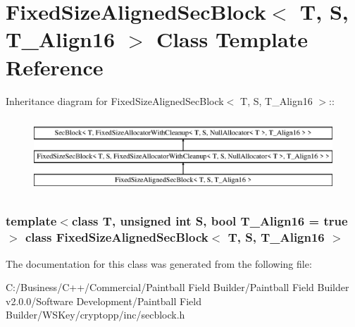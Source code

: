 \hypertarget{class_fixed_size_aligned_sec_block}{
\section{FixedSizeAlignedSecBlock$<$ T, S, T\_\-Align16 $>$ Class Template Reference}
\label{class_fixed_size_aligned_sec_block}
}
Inheritance diagram for FixedSizeAlignedSecBlock$<$ T, S, T\_\-Align16 $>$::\begin{figure}[H]
\begin{center}
\leavevmode
\includegraphics[height=2.85229cm]{class_fixed_size_aligned_sec_block}
\end{center}
\end{figure}
\subsubsection*{template$<$class T, unsigned int S, bool T\_\-Align16 = true$>$ class FixedSizeAlignedSecBlock$<$ T, S, T\_\-Align16 $>$}



The documentation for this class was generated from the following file:\begin{DoxyCompactItemize}
\item 
C:/Business/C++/Commercial/Paintball Field Builder/Paintball Field Builder v2.0.0/Software Development/Paintball Field Builder/WSKey/cryptopp/inc/secblock.h\end{DoxyCompactItemize}
